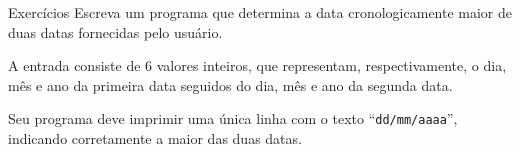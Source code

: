 \documentclass[handout]{beamer}
\begin{document}
\begin{frame}[fragile]{Exercícios}
    Escreva um programa que determina a data cronologicamente maior de duas datas fornecidas pelo usuário.

    A entrada consiste de 6 valores inteiros, que representam, respectivamente, o dia, mês e ano da primeira data seguidos do dia, mês e ano da segunda data.

    Seu programa deve imprimir uma única linha com o texto ``\texttt{dd/mm/aaaa}'', indicando corretamente a maior das duas datas.
\end{frame}
\end{document}
